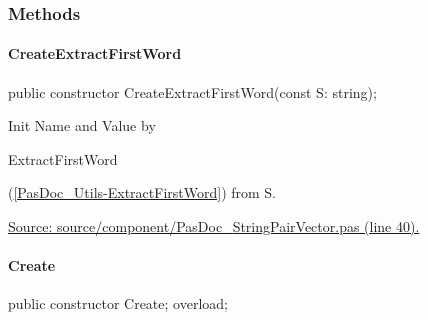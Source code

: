 \documentclass{report}
\newif\ifpdf
\begin{document}
\subsubsection*{\large{\textbf{Methods}}\normalsize\hspace{1ex}\hfill}
\paragraph*{CreateExtractFirstWord}\hspace*{\fill}

\label{PasDoc_StringPairVector.TStringPair-CreateExtractFirstWord}
\begin{list}{}{
\setlength{\itemindent}{0cm}
\setlength{\listparindent}{0cm}
\setlength{\leftmargin}{\evensidemargin}
\addtolength{\leftmargin}{\tmplength}
\settowidth{\labelsep}{X}
\addtolength{\leftmargin}{\labelsep}
\setlength{\labelwidth}{\tmplength}
}
\item[\textbf{Declaration}\hfill]
\ifpdf
\begin{flushleft}
\fi
\begin{ttfamily}
public constructor CreateExtractFirstWord(const S: string);\end{ttfamily}

\ifpdf
\end{flushleft}
\fi

\par
\item[\textbf{Description}]
Init Name and Value by \begin{ttfamily}ExtractFirstWord\end{ttfamily}(\ref{PasDoc_Utils-ExtractFirstWord}) from S.\par
\href{https://github.com/pasdoc/pasdoc/blob/master/source/component/PasDoc_StringPairVector.pas#L40}{Source: source/component/PasDoc{\_}StringPairVector.pas (line 40).}

\end{list}
\paragraph*{Create}\hspace*{\fill}

\label{PasDoc_StringPairVector.TStringPair-Create}
\begin{list}{}{
\setlength{\itemindent}{0cm}
\setlength{\listparindent}{0cm}
\setlength{\leftmargin}{\evensidemargin}
\addtolength{\leftmargin}{\tmplength}
\settowidth{\labelsep}{X}
\addtolength{\leftmargin}{\labelsep}
\setlength{\labelwidth}{\tmplength}
}
\item[\textbf{Declaration}\hfill]
\ifpdf
\begin{flushleft}
\fi
\begin{ttfamily}
public constructor Create; overload;\end{ttfamily}

\ifpdf
\end{flushleft}
\fi

\end{list}
\end{document}
